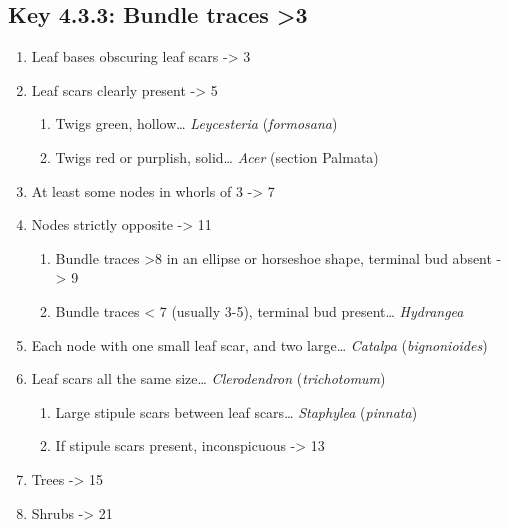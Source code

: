\documentclass[openany]{book}
\providecommand{\tightlist}{%
  \setlength{\itemsep}{0pt}\setlength{\parskip}{0pt}}
\begin{document}
\hypertarget{key-4.3.3-bundle-traces-3}{%
\subsection{Key 4.3.3: Bundle traces
\textgreater{}3}\label{key-4.3.3-bundle-traces-3}}

\begin{enumerate}
\def\labelenumi{\arabic{enumi}.}
\tightlist
\item
  Leaf bases obscuring leaf scars -\textgreater{} 3
\item
  Leaf scars clearly present -\textgreater{} 5

  \begin{enumerate}
  \def\labelenumii{\arabic{enumii}.}
  \setcounter{enumii}{2}
  \tightlist
  \item
    Twigs green, hollow\ldots{} \emph{Leycesteria} (\emph{formosana})
  \item
    Twigs red or purplish, solid\ldots{} \emph{Acer} (section Palmata)
  \end{enumerate}
\item
  At least some nodes in whorls of 3 -\textgreater{} 7
\item
  Nodes strictly opposite -\textgreater{} 11

  \begin{enumerate}
  \def\labelenumii{\arabic{enumii}.}
  \setcounter{enumii}{6}
  \tightlist
  \item
    Bundle traces \textgreater{}8 in an ellipse or horseshoe shape,
    terminal bud absent -\textgreater{} 9
  \item
    Bundle traces \textless{} 7 (usually 3-5), terminal bud
    present\ldots{} \emph{Hydrangea}
  \end{enumerate}
\item
  Each node with one small leaf scar, and two large\ldots{}
  \emph{Catalpa} (\emph{bignonioides})
\item
  Leaf scars all the same size\ldots{} \emph{Clerodendron}
  (\emph{trichotomum})

  \begin{enumerate}
  \def\labelenumii{\arabic{enumii}.}
  \setcounter{enumii}{10}
  \tightlist
  \item
    Large stipule scars between leaf scars\ldots{} \emph{Staphylea}
    (\emph{pinnata})
  \item
    If stipule scars present, inconspicuous -\textgreater{} 13
  \end{enumerate}
\item
  Trees -\textgreater{} 15
\item
  Shrubs -\textgreater{} 21


\end{enumerate}
\end{document}
